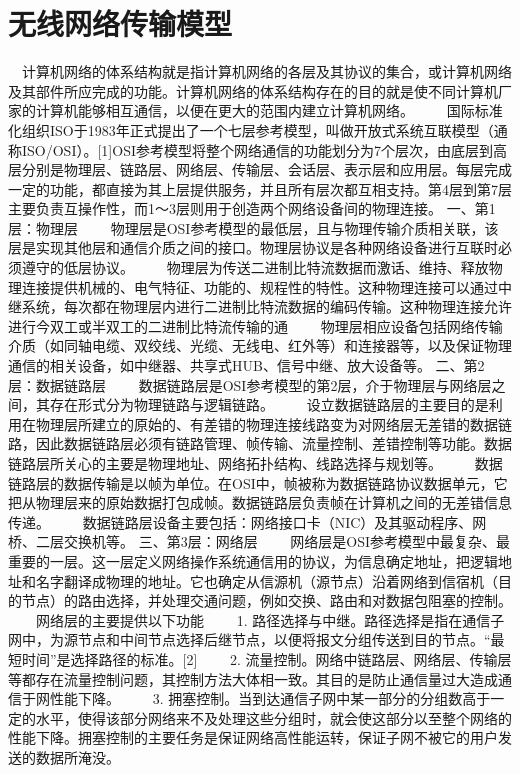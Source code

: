 \section{无线网络传输模型}
　计算机网络的体系结构就是指计算机网络的各层及其协议的集合，或计算机网络及其部件所应完成的功能。计算机网络的体系结构存在的目的就是使不同计算机厂家的计算机能够相互通信，以便在更大的范围内建立计算机网络。
　　国际标准化组织ISO于1983年正式提出了一个七层参考模型，叫做开放式系统互联模型（通称ISO/OSI）。[1]OSI参考模型将整个网络通信的功能划分为7个层次，由底层到高层分别是物理层、链路层、网络层、传输层、会话层、表示层和应用层。每层完成一定的功能，都直接为其上层提供服务，并且所有层次都互相支持。第4层到第7层主要负责互操作性，而1～3层则用于创造两个网络设备间的物理连接。
        一、第1层：物理层
　　物理层是OSI参考模型的最低层，且与物理传输介质相关联，该层是实现其他层和通信介质之间的接口。物理层协议是各种网络设备进行互联时必须遵守的低层协议。 
　　物理层为传送二进制比特流数据而激话、维持、释放物理连接提供机械的、电气特征、功能的、规程性的特性。这种物理连接可以通过中继系统，每次都在物理层内进行二进制比特流数据的编码传输。这种物理连接允许进行今双工或半双工的二进制比特流传输的通   
　　物理层相应设备包括网络传输介质（如同轴电缆、双绞线、光缆、无线电、红外等）和连接器等，以及保证物理通信的相关设备，如中继器、共享式HUB、信号中继、放大设备等。
        二、第2层：数据链路层
　　数据链路层是OSI参考模型的第2层，介于物理层与网络层之间，其存在形式分为物理链路与逻辑链路。
　　设立数据链路层的主要目的是利用在物理层所建立的原始的、有差错的物理连接线路变为对网络层无差错的数据链路，因此数据链路层必须有链路管理、帧传输、流量控制、差错控制等功能。数据链路层所关心的主要是物理地址、网络拓扑结构、线路选择与规划等。
　　数据链路层的数据传输是以帧为单位。在OSI中，帧被称为数据链路协议数据单元，它把从物理层来的原始数据打包成帧。数据链路层负责帧在计算机之间的无差错信息传递。
　　数据链路层设备主要包括：网络接口卡（NIC）及其驱动程序、网桥、二层交换机等。
        三、第3层：网络层
　　网络层是OSI参考模型中最复杂、最重要的一层。这一层定义网络操作系统通信用的协议，为信息确定地址，把逻辑地址和名字翻译成物理的地址。它也确定从信源机（源节点）沿着网络到信宿机（目的节点）的路由选择，并处理交通问题，例如交换、路由和对数据包阻塞的控制。
　　网络层的主要提供以下功能
　　1.  路径选择与中继。路径选择是指在通信子网中，为源节点和中间节点选择后继节点，以便将报文分组传送到目的节点。“最短时间”是选择路径的标准。[2]
　　2.  流量控制。网络中链路层、网络层、传输层等都存在流量控制问题，其控制方法大体相一致。其目的是防止通信量过大造成通信于网性能下降。
　　3.  拥塞控制。当到达通信子网中某一部分的分组数高于一定的水平，使得该部分网络来不及处理这些分组时，就会使这部分以至整个网络的性能下降。拥塞控制的主要任务是保证网络高性能运转，保证子网不被它的用户发送的数据所淹没。
